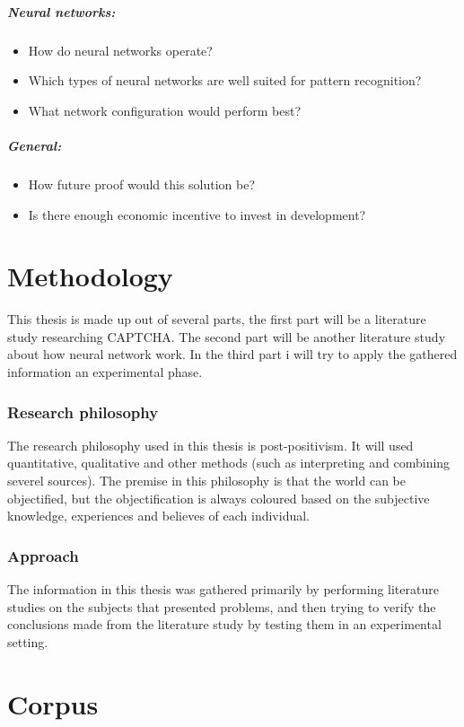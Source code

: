 \documentclass[pdftex,a4paper,12pt,twoside]{report}
\theoremstyle{plain} \newtheorem{theorem}{Theorem} \newtheorem{proposition}{Proposition} \newtheorem{lemma}{Lemma} \newtheorem*{corollary}{Corollary}
\theoremstyle{definition} \newtheorem{definition}{Definition} \newtheorem{conjecture}{Conjecture} \newtheorem*{example}{Example} \newtheorem{algorithm}{Algorithm}
\theoremstyle{remark} \newtheorem*{remark}{Remark} \newtheorem*{note}{Note} \newtheorem{case}{Case}
\begin{document}
\paragraph{Neural networks:}
\begin{itemize}
\item How do neural networks operate?
\item Which types of neural networks are well suited for pattern recognition?
\item What network configuration would perform best?
\end{itemize}
\paragraph{General:}
\begin{itemize}
\item How future proof would this solution be?
\item Is there enough economic incentive to invest in development?
\end{itemize}
\chapter{Methodology}
\label{ch:methodology}
This thesis is made up out of several parts, the first part will be a literature study researching CAPTCHA. The second part will be another literature study about how neural network work. In the third part i will try to apply the gathered information an experimental phase.
\subsection{Research philosophy}
The research philosophy used in this thesis is post-positivism. It will used quantitative, qualitative and other methods (such as interpreting and combining severel sources). The premise in this philosophy is that the world can be objectified, but the objectification is always coloured based on the subjective knowledge, experiences and believes of each individual.
\subsection{Approach}
The information in this thesis was gathered primarily by performing literature studies on the subjects that presented problems, and then trying to verify the conclusions made from the literature study by testing them in an experimental setting.
\chapter{Corpus}
\label{ch:corpus}
\end{document}

